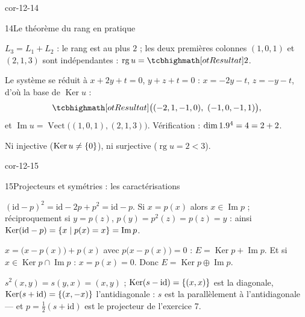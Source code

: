 \begin{blocLivre}{cor-12-14}
\begin{corrige}{14}{Le théorème du rang en pratique}
\begin{questions}
  \item $L_3=L_1+L_2$ : le rang est au plus $2$ ; les deux premières
    colonnes $(1,0,1)$ et $(2,1,3)$ sont indépendantes :
    $\operatorname{rg}u=\res{2}$.
  \item Le système se réduit à $x+2y+t=0$, $y+z+t=0$ :
    $x=-2y-t$, $z=-y-t$, d'où la base de $\operatorname{Ker}u$ :
    \[
    \res{\bigl((-2,1,-1,0),\ (-1,0,-1,1)\bigr)},
    \]
    et $\operatorname{Im}u=\operatorname{Vect}\bigl((1,0,1),(2,1,3)\bigr)$.
    Vérification : $\dim1.9^{4}=4=2+2$.
  \item Ni injective ($\operatorname{Ker}u\neq\left\{0\right\}$), ni surjective
    ($\operatorname{rg}u=2<3$).
\end{questions}
\end{corrige}
\end{blocLivre}

\begin{blocLivre}{cor-12-15}
\begin{corrige}{15}{Projecteurs et symétries : les caractérisations}
\begin{questions}
  \item $(\mathrm{id}-p)^{2}=\mathrm{id}-2p+p^{2}=\mathrm{id}-p$. Si
    $x=p(x)$ alors $x\in\operatorname{Im}p$ ; réciproquement si $y=p(z)$,
    $p(y)=p^{2}(z)=p(z)=y$ : ainsi
    $\operatorname{Ker}(\mathrm{id}-p)=\left\{x\mid p(x)=x\right\}=\operatorname{Im}p$.
  \item $x=\bigl(x-p(x)\bigr)+p(x)$ avec $p\bigl(x-p(x)\bigr)=0$ :
    $E=\operatorname{Ker}p+\operatorname{Im}p$. Et si
    $x\in\operatorname{Ker}p\cap\operatorname{Im}p$ : $x=p(x)=0$. Donc
    $E=\operatorname{Ker}p\oplus\operatorname{Im}p$.
  \item $s^{2}(x,y)=s(y,x)=(x,y)$ ;
    $\operatorname{Ker}(s-\mathrm{id})=\left\{(x,x)\right\}$ est la diagonale,
    $\operatorname{Ker}(s+\mathrm{id})=\left\{(x,-x)\right\}$ l'antidiagonale : $s$
    est la  parallèlement à
    l'antidiagonale — et $p=\frac12(s+\mathrm{id})$ est le projecteur de
    l'exercice 7.
\end{questions}
\end{corrige}
\end{blocLivre}

